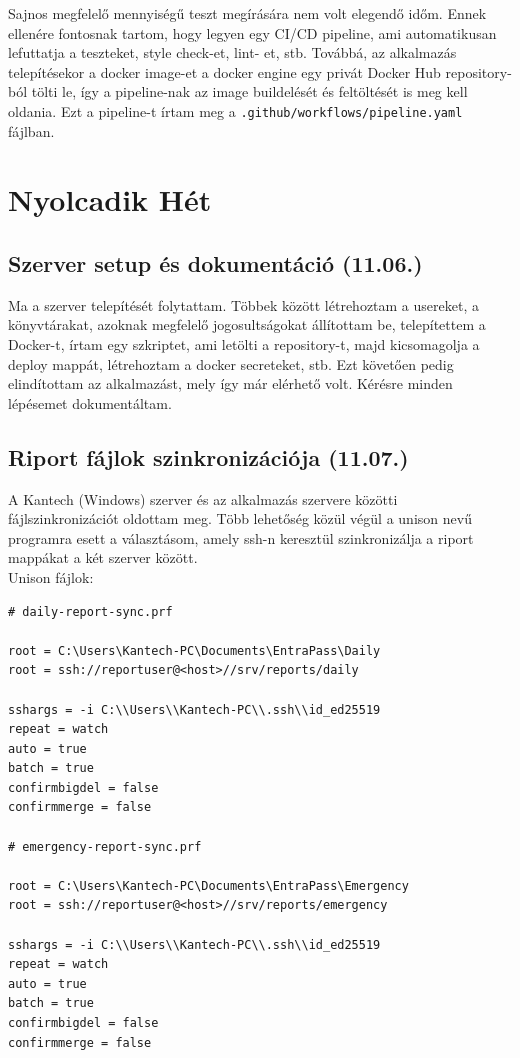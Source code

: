 \documentclass[a4paper]{article}
\newcommand{\inltxt}[1]{\texttt{#1}}
\begin{document}
Sajnos megfelelő mennyiségű teszt megírására nem volt elegendő időm. Ennek ellenére fontosnak
tartom, hogy legyen egy CI/CD pipeline, ami automatikusan lefuttatja a teszteket, style check-et, lint-
et, stb. Továbbá, az alkalmazás telepítésekor a docker image-et a docker engine egy privát Docker Hub
repository-ból tölti le, így a pipeline-nak az image buildelését és feltöltését is meg kell oldania. Ezt a
pipeline-t írtam meg a \inltxt{.github/workflows/pipeline.yaml} fájlban.

\section{Nyolcadik Hét}

\subsection{Szerver setup és dokumentáció (11.06.)}

Ma a szerver telepítését folytattam. Többek között létrehoztam a usereket, a könyvtárakat, azoknak
megfelelő jogosultságokat állítottam be, telepítettem a Docker-t, írtam egy szkriptet, ami letölti a
repository-t, majd kicsomagolja a deploy mappát, létrehoztam a docker secreteket, stb. Ezt követően
pedig elindítottam az alkalmazást, mely így már elérhető volt. Kérésre minden lépésemet
dokumentáltam.

\subsection{Riport fájlok szinkronizációja (11.07.)}

A Kantech (Windows) szerver és az alkalmazás szervere közötti fájlszinkronizációt oldottam meg. Több
lehetőség közül végül a unison nevű programra esett a választásom, amely ssh-n keresztül
szinkronizálja a riport mappákat a két szerver között. \\

Unison fájlok:

\FloatBarrier
\begin{verbatim}
# daily-report-sync.prf

root = C:\Users\Kantech-PC\Documents\EntraPass\Daily
root = ssh://reportuser@<host>//srv/reports/daily

sshargs = -i C:\\Users\\Kantech-PC\\.ssh\\id_ed25519
repeat = watch
auto = true
batch = true
confirmbigdel = false
confirmmerge = false

# emergency-report-sync.prf

root = C:\Users\Kantech-PC\Documents\EntraPass\Emergency
root = ssh://reportuser@<host>//srv/reports/emergency

sshargs = -i C:\\Users\\Kantech-PC\\.ssh\\id_ed25519
repeat = watch
auto = true
batch = true
confirmbigdel = false
confirmmerge = false
\end{verbatim}
\end{document}
